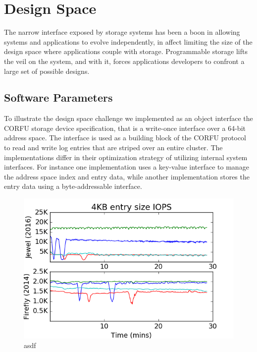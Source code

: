 \section{Design Space}
\label{sec:dspace}

The narrow interface exposed by storage systems has been a boon in allowing
systems and applications to evolve independently, in affect limiting the size
of the design space where applications couple with storage. Programmable
storage lifts the veil on the system, and with it, forces applications developers
to confront a large set of possible designs.

\subsection{Software Parameters}

To illustrate the design space challenge we implemented as an object interface
the CORFU storage device specification, that is a write-once interface over a
64-bit address space. The interface is used as a building block of the CORFU
protocol to read and write log entries that are striped over an entire
cluster.  The implementations differ in their optimization strategy of
utilizing internal system interfaces. For instance one implementation uses a
key-value interface to manage the address space index and entry data, while
another implementation stores the entry data using a byte-addressable
interface.

\begin{figure}[t]
\centering
\includegraphics[width=1.0\linewidth]{jewel_v_firefly_pd.png}
\caption{asdf}
\label{fig:phy-design}
\end{figure}

